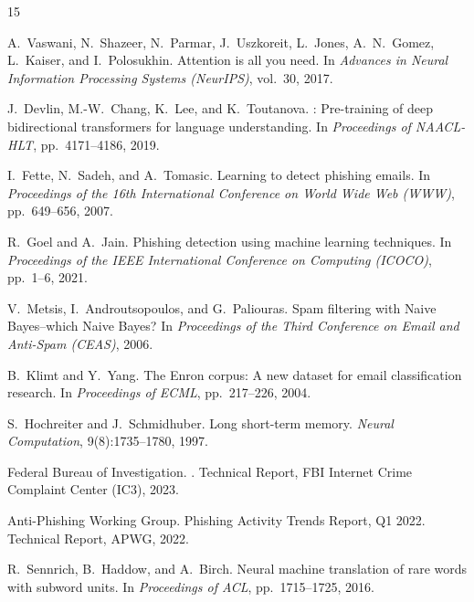 \documentclass[sigconf, nonacm]{acmart}
\begin{document}

\begin{thebibliography}{15}

A.~Vaswani, N.~Shazeer, N.~Parmar, J.~Uszkoreit, L.~Jones,
A.~N.~Gomez, L.~Kaiser, and I.~Polosukhin.
\newblock Attention is all you need.
\newblock In \emph{Advances in Neural Information Processing Systems
  (NeurIPS)}, vol.~30, 2017.

J.~Devlin, M.-W.~Chang, K.~Lee, and K.~Toutanova.
: Pre-training of deep bidirectional transformers for
  language understanding.
\newblock In \emph{Proceedings of NAACL-HLT}, pp.~4171--4186, 2019.

I.~Fette, N.~Sadeh, and A.~Tomasic.
\newblock Learning to detect phishing emails.
\newblock In \emph{Proceedings of the 16th International Conference
  on World Wide Web (WWW)}, pp.~649--656, 2007.

R.~Goel and A.~Jain.
\newblock Phishing detection using machine learning techniques.
\newblock In \emph{Proceedings of the IEEE International Conference
  on Computing (ICOCO)}, pp.~1--6, 2021.

V.~Metsis, I.~Androutsopoulos, and G.~Paliouras.
\newblock Spam filtering with {Naive Bayes}--which {Naive Bayes}?
\newblock In \emph{Proceedings of the Third Conference on Email
  and Anti-Spam (CEAS)}, 2006.

B.~Klimt and Y.~Yang.
\newblock The {Enron} corpus: A new dataset for email classification
  research.
\newblock In \emph{Proceedings of ECML}, pp.~217--226, 2004.

S.~Hochreiter and J.~Schmidhuber.
\newblock Long short-term memory.
\newblock \emph{Neural Computation}, 9(8):1735--1780, 1997.

Federal Bureau of Investigation.
.
\newblock Technical Report, FBI Internet Crime Complaint Center
  (IC3), 2023.

Anti-Phishing Working Group.
\newblock Phishing Activity Trends Report, {Q1} 2022.
\newblock Technical Report, APWG, 2022.

R.~Sennrich, B.~Haddow, and A.~Birch.
\newblock Neural machine translation of rare words with subword
  units.
\newblock In \emph{Proceedings of ACL}, pp.~1715--1725, 2016.


\end{thebibliography}
\end{document}
